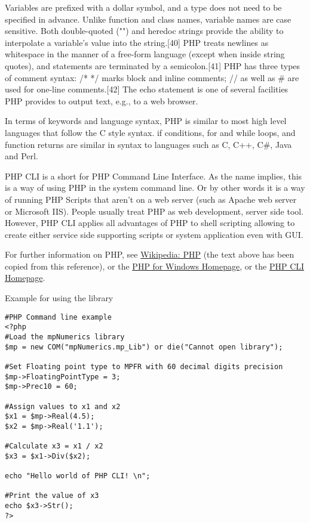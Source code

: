 \vpara
Variables are prefixed with a dollar symbol, and a type does not need to be specified in advance. Unlike function and class names, variable names are case sensitive. Both double-quoted ("") and heredoc strings provide the ability to interpolate a variable's value into the string.[40] PHP treats newlines as whitespace in the manner of a free-form language (except when inside string quotes), and statements are terminated by a semicolon.[41] PHP has three types of comment syntax: /* */ marks block and inline comments; // as well as \# are used for one-line comments.[42] The echo statement is one of several facilities PHP provides to output text, e.g., to a web browser.

\vpara
In terms of keywords and language syntax, PHP is similar to most high level languages that follow the C style syntax. if conditions, for and while loops, and function returns are similar in syntax to languages such as C, C++, C\#, Java and Perl.

\vpara
PHP CLI is a short for PHP Command Line Interface. As the name implies, this is a way of using PHP in the system command line. Or by other words it is a way of running PHP Scripts that aren't on a web server (such as Apache web server or Microsoft IIS). People usually treat PHP as web development, server side tool. However, PHP CLI applies all advantages of PHP to shell scripting allowing to create either service side supporting scripts or system application even with GUI.

\vpara
For further information on PHP, see \href{http://en.wikipedia.org/wiki/PHP}{Wikipedia: PHP} (the text above has been copied from this reference), or the  \href{http://windows.php.net/}{PHP for Windows Homepage}, or the  \href{http://www.php-cli.com/}{PHP CLI Homepage}.

\vpara
Example for using the library

\begin{lstlisting}
#PHP Command line example
<?php
#Load the mpNumerics library
$mp = new COM("mpNumerics.mp_Lib") or die("Cannot open library");

#Set Floating point type to MPFR with 60 decimal digits precision
$mp->FloatingPointType = 3;
$mp->Prec10 = 60;

#Assign values to x1 and x2
$x1 = $mp->Real(4.5);
$x2 = $mp->Real('1.1');

#Calculate x3 = x1 / x2
$x3 = $x1->Div($x2);

echo "Hello world of PHP CLI! \n";

#Print the value of x3
echo $x3->Str();
?>
\end{lstlisting}



